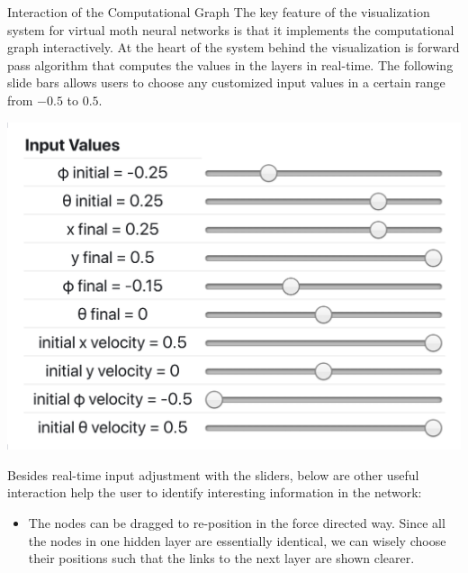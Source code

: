 \documentclass[final,hyperref={pdfpagelabels=false}]{beamer}
\begin{document}
\begin{frame}{}
\begin{columns}[t]
\begin{column}{.3\linewidth}
\begin{block}{Interaction of the Computational Graph}
The key feature of the visualization system for virtual moth neural networks is that it implements the computational graph interactively. At the heart of the system behind the visualization is forward pass algorithm that computes the values in the layers in real-time. The following slide bars allows users to choose any customized input values in a certain range from $-0.5$ to $0.5$. \\
\vspace{0cm}
      \begin{center}
                \includegraphics[scale=0.5]{slider.png}
      \end{center}
      \vspace{1cm}

Besides real-time input adjustment with the sliders, below are other useful interaction help the user to identify interesting information in the network: 
\bigskip
\begin{itemize}
\item The nodes can be dragged to re-position in the force directed way. Since all the nodes in one hidden layer are essentially identical, we can wisely choose their positions such that the links to the next layer are shown clearer.


\end{itemize}
\end{block}
\end{column}
\end{columns}
\end{frame}
\end{document}
